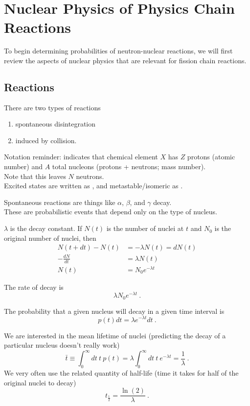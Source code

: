 \documentclass[12pt]{article}
\begin{document}
\clearpage
\section*{Nuclear Physics of Physics Chain Reactions}
To begin determining probabilities of neutron-nuclear reactions, we will first review the aspects of nuclear physics that are relevant for fission chain reactions. 

\subsection*{Reactions}
There are two types of reactions
\begin{enumerate}
\item spontaneous disintegration
\item induced by collision.
\end{enumerate}

Notation reminder:  indicates that chemical element $X$ has $Z$ protons (atomic number) and $A$ total nucleons (protons + neutrons; mass number).\\
Note that this leaves $N$ neutrons.\\
Excited states are written as , and metastable/isomeric as .

Spontaneous reactions are things like $\alpha$, $\beta$, and $\gamma$ decay.\\
These are probabilistic events that depend only on the type of nucleus.

$\lambda$ is the decay constant. If $N(t)$ is the number of nuclei at $t$ and $N_0$ is the original number of nuclei, then
%
\begin{align*}
N(t + dt) - N(t) &= -\lambda N(t) = dN(t)\\
-\frac{dN}{dt} &= \lambda N(t)\\
N(t) &= N_0 e^{-\lambda t}
\end{align*}

The rate of decay is\[\lambda N_0 e^{-\lambda t} \:.\]

The probability that a given nucleus will decay in a given time interval is \[p(t) dt = \lambda e^{-\lambda t} dt \:.\]

We are interested in the mean lifetime of nuclei (predicting the decay of a particular nucleus doesn't really work)
\[\bar{t} \equiv \int_0^\infty dt \: t \: p(t) = \lambda \int_0^\infty dt \: t \: e^{-\lambda t} = \frac{1}{\lambda} \:. \]
We very often use the related quantity of half-life (time it takes for half of the original nuclei to decay) 
\[t_{\frac{1}{2}} = \frac{\ln(2)}{\lambda} \:. \]
\end{document}
